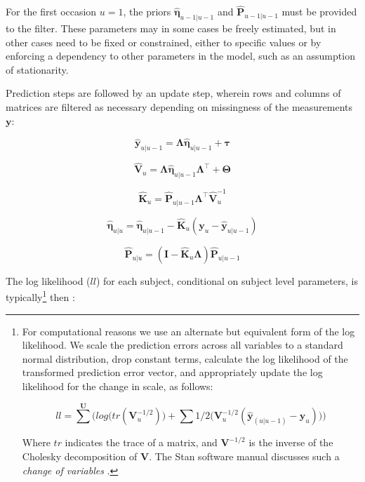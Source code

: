 \documentclass[nojss]{jss}\usepackage[]{graphicx}\usepackage[]{color}
\newcommand{\vect}[1]{\boldsymbol{\mathbf{#1}}}
\begin{document}
For the first occasion $u = 1$, the priors $\hat{\vect{\eta}}_{u-1|u-1}$ and $\hat{\vect{P}}_{u-1|u-1}$ must be provided to the filter. These parameters may in some cases be freely estimated, but in other cases need to be fixed or constrained, either to specific values or by enforcing a dependency to other parameters in the model, such as an assumption of stationarity. 

Prediction steps are followed by an update step, wherein rows and columns of matrices are filtered as necessary depending on missingness of the measurements $\vect{y}$:

\begin{equation}
\hat{\vect{y}}_{u|u-1} =  \vect{\Lambda} \hat{\vect{\eta}}_{u|u-1} + \vect{\tau}
\end{equation}

\begin{equation}
\hat{\vect{V}}_{u} = \vect{\Lambda} \hat{\vect{\eta}}_{u|u-1} \vect{\Lambda}^\top + \vect{\Theta}
\end{equation}      

\begin{equation}
\hat{\vect{K}}_u = \hat{\vect{P}}_{u|u-1} \vect{\Lambda}^\top  \hat{\vect{V}}_{u}^{-1}
\end{equation}

\begin{equation}
\hat{\vect{\eta}}_{u|u} =  \hat{\vect{\eta}}_{u|u-1} - \hat{\vect{K}}_u ( \vect{y}_u -  \hat{\vect{y}}_{u|u-1}) 
\end{equation}

\begin{equation}
\hat{\vect{P}}_{u|u}  = (\vect{I} - \hat{\vect{K}}_u \vect{\Lambda}) \hat{\vect{P}}_{u|u-1} 
\end{equation}

The log likelihood ($ll$) for each subject, conditional on subject level parameters, is typically\footnote{For computational reasons we use an alternate but equivalent form of the log likelihood. We scale the prediction errors across all variables to a standard normal distribution, drop constant terms, calculate the log likelihood of the transformed prediction error vector, and appropriately update the log likelihood for the change in scale, as follows: 

\begin{equation}
ll = \sum^{\vect{U}} \bigg(  log\big(tr(\vect{V}^{-1/2}_{u})\big) + \sum{ 1/2 \big(\vect{V}^{-1/2}_{u} ( \hat{\vect{y}}_{(u|u-1)} - \vect{y}_u ) \big)} \bigg)
\end{equation}

Where $tr$ indicates the trace of a matrix, and $\vect{V}^{-1/2}$ is the inverse of the Cholesky decomposition of $\vect{V}$. The Stan software manual discusses such a \textit{change of variables} \citep{standevelopmentteam2016stan}.} then \citep{genz2009computation}:
\end{document}
